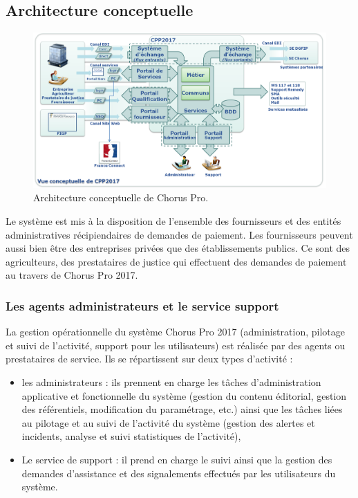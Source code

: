 \documentclass[12pt,a4paper]{article}
\begin{document}
\subsection{Architecture conceptuelle}
\begin{figure}[H]
	\begin{center}
		\includegraphics[width=\textwidth, height=\textheight, keepaspectratio]{archiConceptuelle.png}
		\caption{Architecture conceptuelle de Chorus Pro.}
	\end{center}
\end{figure}
Le système est mis à la disposition de l’ensemble des fournisseurs et des entités administratives récipiendaires de demandes de paiement. Les fournisseurs peuvent aussi bien être des entreprises privées que des établissements publics. Ce sont des agriculteurs, des prestataires de justice qui effectuent des demandes de paiement au travers de Chorus Pro 2017.
\subsubsection{Les agents administrateurs et le service support}
La gestion opérationnelle du système Chorus Pro 2017 (administration, pilotage et suivi de l’activité, support pour les utilisateurs) est réalisée par des agents ou prestataires de service. Ils se répartissent sur deux types d’activité : 
\begin{itemize}
\item les administrateurs : ils prennent en charge les tâches d’administration applicative et fonctionnelle du système (gestion du contenu éditorial, gestion des référentiels, modification du paramétrage, etc.) ainsi que les tâches liées au pilotage et au suivi de l’activité du système (gestion des alertes et incidents, analyse et suivi statistiques de l’activité),
\item Le service de support : il prend en charge le suivi ainsi que la gestion des demandes d’assistance et des signalements effectués par les utilisateurs du système.
\end{itemize}
\end{document}
